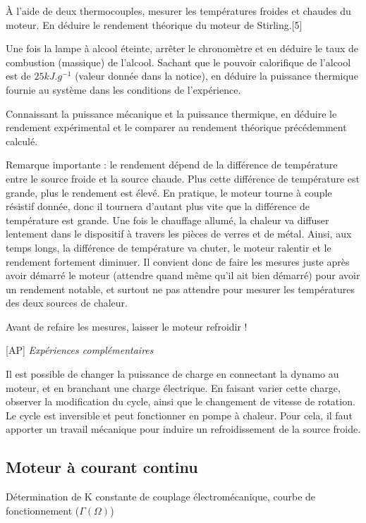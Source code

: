 \documentclass{article}%
\begin{document}
À l'aide de deux thermocouples, mesurer les températures froides et chaudes du moteur. En déduire le rendement théorique du moteur de Stirling.[5]

Une fois la lampe à alcool éteinte, arrêter le chronomètre et en déduire le taux de combustion (massique) de l'alcool. Sachant que le pouvoir calorifique de l'alcool est de $25 kJ.g^{-1}$ (valeur donnée dans la notice), en déduire la puissance thermique fournie au système dans les conditions de l'expérience.

Connaissant la puissance mécanique et la puissance thermique, en déduire le rendement expérimental et le comparer au rendement théorique précédemment calculé.

Remarque importante : le rendement dépend de la différence de température entre le source froide et la source chaude. Plus cette différence de température est grande, plus le rendement est élevé. En pratique, le moteur tourne à couple résistif donnée, donc il tournera d'autant plus vite que la différence de température est grande. Une fois le chauffage allumé, la chaleur va diffuser lentement dans le dispositif à travers les pièces de verres et de métal. Ainsi, aux temps longs, la différence de température va chuter, le moteur ralentir et le rendement fortement diminuer. Il convient donc de faire les mesures juste après avoir démarré le moteur (attendre quand même qu'il ait bien démarré) pour avoir un rendement notable, et surtout ne pas attendre pour mesurer les températures des deux sources de chaleur.

Avant de refaire les mesures, laisser le moteur refroidir !

[AP] \textit{Expériences complémentaires}

    Il est possible de changer la puissance de charge en connectant la dynamo au moteur, et en branchant une charge électrique. En faisant varier cette charge, observer la modification du cycle, ainsi que le changement de vitesse de rotation.
    Le cycle est inversible et peut fonctionner en pompe à chaleur. Pour cela, il faut apporter un travail mécanique pour induire un refroidissement de la source froide.

\subsection{Moteur à courant continu}

Détermination de K constante de couplage électromécanique, courbe de fonctionnement ($\Gamma (\Omega )$)
\end{document}
